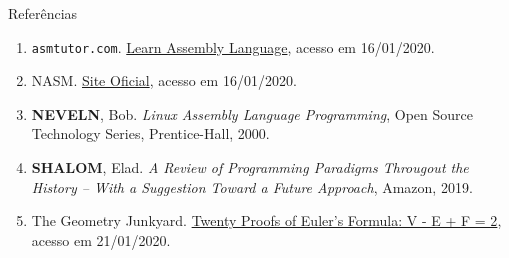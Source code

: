 \begin{frame}[fragile]{Referências}

    \begin{enumerate}
        \item \texttt{asmtutor.com}. \href{https://asmtutor.com/#lesson1}{Learn Assembly Language},
            acesso em 16/01/2020.
  
        \item NASM. \href{https://www.nasm.us/}{Site Oficial}, acesso em 16/01/2020.
 
        \item \textbf{NEVELN}, Bob. \textit{Linux Assembly Language Programming}, Open Source
            Technology Series, Prentice-Hall, 2000.

        \item \textbf{SHALOM}, Elad. \textit{A Review of Programming Paradigms Througout the 
            History -- With a Suggestion Toward a Future Approach}, Amazon, 2019.

        \item The Geometry Junkyard. \href{https://www.ics.uci.edu/~eppstein/junkyard/euler/}{Twenty Proofs of Euler's Formula: V - E + F = 2}, acesso em 21/01/2020. 

    \end{enumerate}

\end{frame}
